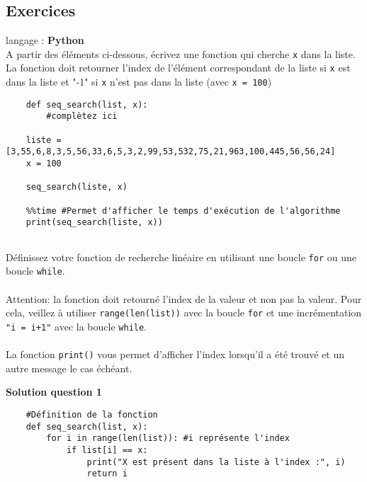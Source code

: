 \subsection{Exercices}

\begin{Exercice}[5 minutes] langage : \textbf{Python}\\

A partir des éléments ci-dessous, écrivez une fonction qui cherche \lstinline{x} dans la liste.\\La fonction doit retourner l'index de l'élément correspondant de la liste si \lstinline{x} est dans la liste et "-1" si \lstinline{x} n'est pas dans la liste (avec \lstinline{x = 100})\\

\begin{verbatim}
    def seq_search(list, x):
        #complètez ici
        
    liste = [3,55,6,8,3,5,56,33,6,5,3,2,99,53,532,75,21,963,100,445,56,56,24]
    x = 100
    
    seq_search(liste, x)
        
    %%time #Permet d'afficher le temps d'exécution de l'algorithme 
    print(seq_search(liste, x))
    
\end{verbatim}

\begin{conseil}
    Définissez votre fonction de recherche linéaire en utilisant une boucle \lstinline{for} ou une boucle \lstinline{while}.\\\\
    Attention: la fonction doit retourné l'index de la valeur et non pas la valeur. Pour cela, veillez à utiliser \lstinline{range(len(list))} avec la boucle \lstinline{for} et une incrémentation \lstinline{"i = i+1"} avec la boucle \lstinline{while}.\\\\
    La fonction \lstinline{print()} vous permet d'afficher l'index lorsqu'il a été trouvé et un autre message le cas échéant. 
\end{conseil}
    
    
\textbf{Solution question 1}

\begin{verbatim}
    #Définition de la fonction
    def seq_search(list, x):
        for i in range(len(list)): #i représente l'index 
            if list[i] == x:
                print("X est présent dans la liste à l'index :", i)
                return i
                

\end{verbatim}
\end{Exercice}
